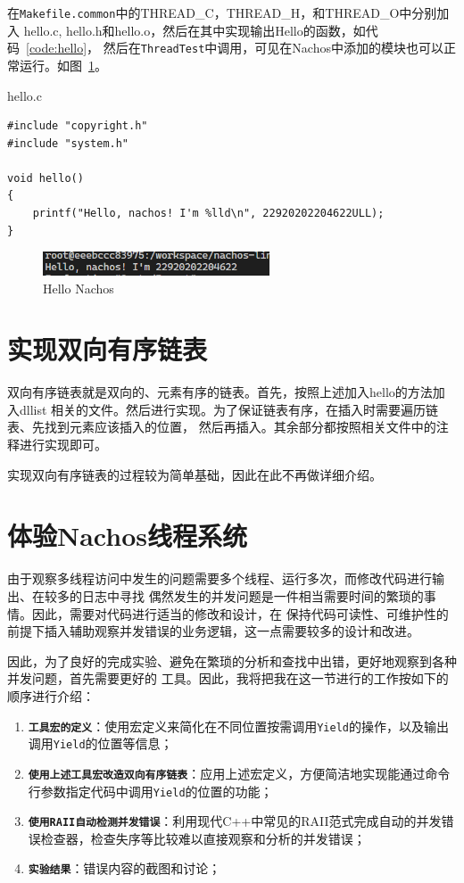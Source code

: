 \documentclass[a4paper,twoside]{article}
\begin{document}
\begin{spacing}{1.2}
在\texttt{Makefile.common}中的THREAD\_C，THREAD\_H，和THREAD\_O中分别加入
hello.c, hello.h和hello.o，然后在其中实现输出Hello的函数，如代码~\ref{code:hello}，
然后在\texttt{ThreadTest}中调用，可见在Nachos中添加的模块也可以正常运行。如图~\ref{fig:hello}。
\begin{listing}[htb]
	\caption{hello.c}
	\label{code:hello}
	\begin{verbatim}
#include "copyright.h"
#include "system.h"

void hello()
{
    printf("Hello, nachos! I'm %lld\n", 22920202204622ULL);
}
	\end{verbatim}
\end{listing}
\begin{figure}[H]
	\centering
	\includegraphics[width=0.6\textwidth]{images/hello.png}
	\caption{Hello Nachos}
	\label{fig:hello}
\end{figure}

\section{实现双向有序链表}

双向有序链表就是双向的、元素有序的链表。首先，按照上述加入hello的方法加入dllist
相关的文件。然后进行实现。为了保证链表有序，在插入时需要遍历链表、先找到元素应该插入的位置，
然后再插入。其余部分都按照相关文件中的注释进行实现即可。

实现双向有序链表的过程较为简单基础，因此在此不再做详细介绍。


\section{体验Nachos线程系统}

由于观察多线程访问中发生的问题需要多个线程、运行多次，而修改代码进行输出、在较多的日志中寻找
偶然发生的并发问题是一件相当需要时间的繁琐的事情。因此，需要对代码进行适当的修改和设计，在
保持代码可读性、可维护性的前提下插入辅助观察并发错误的业务逻辑，这一点需要较多的设计和改进。

因此，为了良好的完成实验、避免在繁琐的分析和查找中出错，更好地观察到各种并发问题，首先需要更好的
工具。因此，我将把我在这一节进行的工作按如下的顺序进行介绍：

\begin{enumerate}
	\item \texttt{\textbf{工具宏的定义}}：使用宏定义来简化在不同位置按需调用\texttt{Yield}的操作，以及输出调用\texttt{Yield}的位置等信息；
	\item \texttt{\textbf{使用上述工具宏改造双向有序链表}}：应用上述宏定义，方便简洁地实现能通过命令行参数指定代码中调用\texttt{Yield}的位置的功能；
	\item \texttt{\textbf{使用RAII自动检测并发错误}}：利用现代C++中常见的RAII范式完成自动的并发错误检查器，检查失序等比较难以直接观察和分析的并发错误；
	\item \texttt{\textbf{实验结果}}：错误内容的截图和讨论；
\end{enumerate}


\end{spacing}
\end{document}
